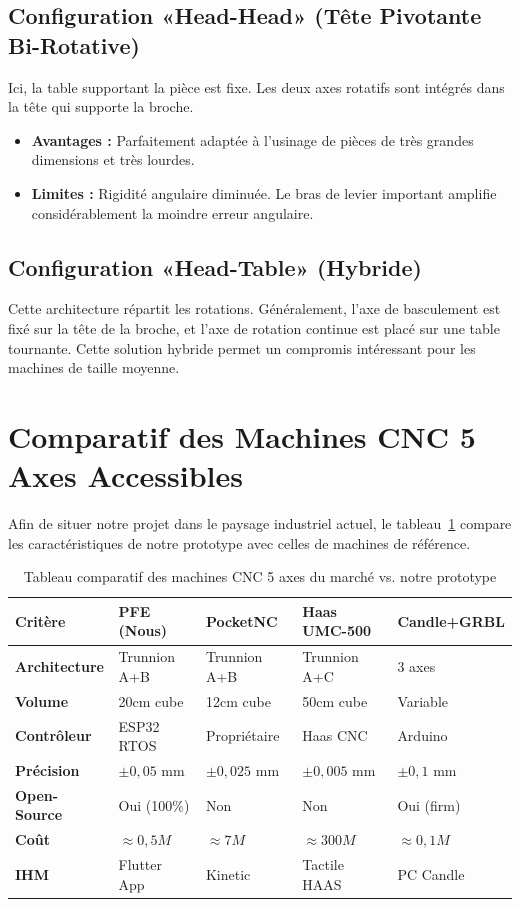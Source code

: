 \subsection{Configuration «Head-Head» (Tête Pivotante Bi-Rotative)}
Ici, la table supportant la pièce est fixe. Les deux axes rotatifs sont intégrés dans la tête qui supporte la broche.
\begin{itemize}
    \item \textbf{Avantages :} Parfaitement adaptée à l'usinage de pièces de très grandes dimensions et très lourdes.
    \item \textbf{Limites :} Rigidité angulaire diminuée. Le bras de levier important amplifie considérablement la moindre erreur angulaire.
\end{itemize}

\subsection{Configuration «Head-Table» (Hybride)}
Cette architecture répartit les rotations. Généralement, l'axe de basculement est fixé sur la tête de la broche, et l'axe de rotation continue est placé sur une table tournante. Cette solution hybride permet un compromis intéressant pour les machines de taille moyenne.

\section{Comparatif des Machines CNC 5 Axes Accessibles}
Afin de situer notre projet dans le paysage industriel actuel, le tableau~\ref{tab:comparatif_cnc} compare les caractéristiques de notre prototype avec celles de machines de référence.

\begin{table}[htbp]
\centering
\renewcommand{\arraystretch}{1.3}
\begin{tabular}{|p{2.5cm}|p{2cm}|p{2cm}|p{2.5cm}|p{2.5cm}|}
\hline
\rowcolor{macouleur!20}
\textbf{Critère} & \textbf{PFE (Nous)} & \textbf{PocketNC} & \textbf{Haas UMC-500} & \textbf{Candle+GRBL} \\
\hline
\textbf{Architecture} & Trunnion A+B & Trunnion A+B & Trunnion A+C & 3 axes \\
\hline
\textbf{Volume} & 20cm cube & 12cm cube & 50cm cube & Variable \\
\hline
\textbf{Contrôleur} & ESP32 RTOS & Propriétaire & Haas CNC & Arduino \\
\hline
\textbf{Précision} & $\pm 0{,}05$ mm & $\pm 0{,}025$ mm & $\pm 0{,}005$ mm & $\pm 0{,}1$ mm \\
\hline
\textbf{Open-Source} & Oui (100\%) & Non & Non & Oui (firm) \\
\hline
\textbf{Coût} & $\approx 0{,}5 M$ & $\approx 7 M$ & $\approx 300 M$ & $\approx 0{,}1 M$ \\
\hline
\textbf{IHM} & Flutter App & Kinetic & Tactile HAAS & PC Candle \\
\hline
\end{tabular}
\caption{Tableau comparatif des machines CNC 5 axes du marché vs. notre prototype}
\label{tab:comparatif_cnc}
\end{table}

